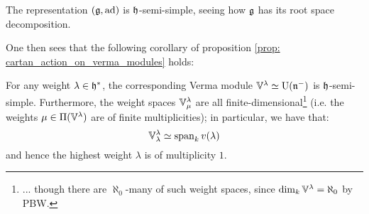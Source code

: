         \begin{example}
            The representation $(\mathfrak{g}, \mathrm{ad})$ is $\mathfrak{h}$-semi-simple, seeing how $\mathfrak{g}$ has its root space decomposition. 
        \end{example}
        One then sees that the following corollary of proposition \ref{prop: cartan_action_on_verma_modules} holds:
        \begin{corollary} \label{coro: verma_modules_are_cartan_semi_simple}
            For any weight $\lambda \in \mathfrak{h}^*$, the corresponding Verma module $\mathbb{V}^{\lambda} \simeq \mathrm{U}(\mathfrak{n}^-)$ is $\mathfrak{h}$-semi-simple. Furthermore, the weight spaces $\mathbb{V}^{\lambda}_{\mu}$ are all finite-dimensional\footnote{... though there are $\aleph_0$-many of such weight spaces, since $\dim_k \mathbb{V}^{\lambda} = \aleph_0$ by PBW.} (i.e. the weights $\mu \in \Pi(\mathbb{V}^{\lambda})$ are of finite multiplicities); in particular, we have that:
                $$\mathbb{V}^{\lambda}_{\lambda} \simeq \operatorname{span}_k v(\lambda)$$
            and hence the highest weight $\lambda$ is of multiplicity $1$. 
        \end{corollary}

